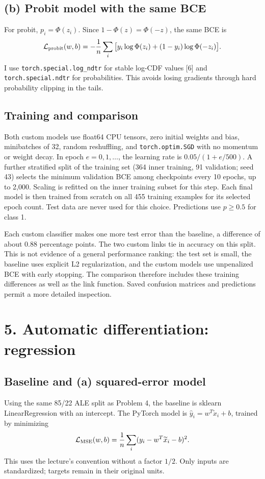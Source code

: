 \documentclass[10pt,letterpaper]{article}
\newcommand{\code}[1]{\texttt{#1}}
\begin{document}
\subsection*{(b) Probit model with the same BCE}
For probit, $p_i=\Phi(z_i)$. Since $1-\Phi(z)=\Phi(-z)$, the same BCE is
\[
\mathcal L_{\rm probit}(w,b)
=-\frac1n\sum_i\big[y_i\log\Phi(z_i)+(1-y_i)\log\Phi(-z_i)\big].
\]
I use \code{torch.special.log\_ndtr} for stable log-CDF values [6] and
\code{torch.special.ndtr} for probabilities. This avoids losing gradients through
hard probability clipping in the tails.

\subsection*{Training and comparison}
Both custom models use float64 CPU tensors, zero initial weights and bias,
minibatches of 32, random reshuffling, and \code{torch.optim.SGD} with no momentum
or weight decay. In epoch $e=0,1,\ldots$, the learning rate is
$0.05/(1+e/500)$. A further stratified split of the training set (364 inner
training, 91 validation; seed 43) selects the minimum validation BCE among
checkpoints every 10 epochs, up to 2,000. Scaling is refitted on the inner
training subset for this step. Each final model is then trained from scratch
on all 455 training examples for its selected epoch count. Test data are never
used for this choice. Predictions use $p\ge0.5$ for class 1.

\begin{center}\small

\end{center}
Each custom classifier makes one more test error than the baseline, a difference
of about 0.88 percentage points. The two custom links tie in accuracy on this
split. This is not evidence of a general performance ranking: the test set is
small, the baseline uses explicit L2 regularization, and the custom models use
unpenalized BCE with early stopping. The comparison therefore includes these
training differences as well as the link function. Saved confusion matrices
and predictions permit a more detailed inspection.

\newpage
\section*{5. Automatic differentiation: regression}
\subsection*{Baseline and (a) squared-error model}
Using the same 85/22 ALE split as Problem 4, the baseline is sklearn
LinearRegression with an intercept. The PyTorch model is
$\widehat y_i=w^T\widetilde x_i+b$, trained by minimizing
\[
\mathcal L_{\rm MSE}(w,b)=\frac1n\sum_i(y_i-w^T\widetilde x_i-b)^2.
\]
This uses the lecture's convention without a factor $1/2$.
Only inputs are standardized; targets remain in their original units.
\end{document}
